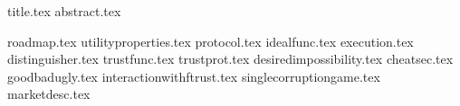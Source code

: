 \documentclass[11pt]{llncs}
\begin{document}
{title.tex}
\thispagestyle{plain}
{abstract.tex}

{roadmap.tex}
{utilityproperties.tex}
{protocol.tex}
{idealfunc.tex}
{execution.tex}
{distinguisher.tex}
{trustfunc.tex}
{trustprot.tex}
{desiredimpossibility.tex}
{cheatsec.tex}
{goodbadugly.tex}
{interactionwithftrust.tex}
{singlecorruptiongame.tex}
{marketdesc.tex}

\end{document}
